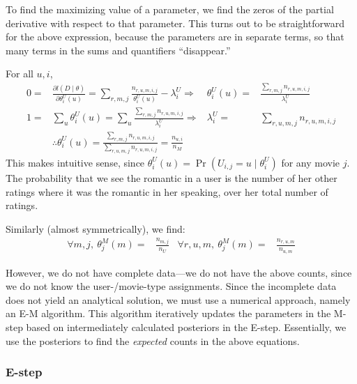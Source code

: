 \documentclass{article}
\newcommand{\LLL}  [2]{{ l \left( #1 \mid #2 \right) }}
\newcommand{\PO}   [1]{{ \Pr \left( #1 \right) }}
\newcommand{\PP}   [2]{{ \PO{ #1 \mid #2 } }}
\begin{document}
To find the maximizing value of a parameter, we find the zeros of the
partial derivative with respect to that parameter. This turns out to
be straightforward for the above expression, because the parameters
are in separate terms, so that many terms in the sums and quantifiers
``disappear.''

For all $u,i$,
\begin{align}
  0 =& \frac{ \partial \LLL{D}{\theta} }{ \partial \theta^U_i(u) }
  = \sum_{r,m,j} \frac{ n_{r,u,m,i,j} }{ \theta^U_i(u) } - \lambda^U_i
  \Rightarrow &
  \theta^U_i(u) =& \frac{ \sum_{r,m,j} n_{r,u,m,i,j} }{ \lambda^U_i } \\
  1 =& \sum_u \theta^U_i(u) 
  = \sum_u \frac{ \sum_{r,m,j} n_{r,u,m,i,j} }{ \lambda^U_i }
  \Rightarrow &
  \lambda^U_i =& \sum_{r,u,m,j} n_{r,u,m,i,j} \\
  & \therefore \theta^U_i(u)
  = \frac{ \sum_{r,m,j} n_{r,u,m,i,j} }{ \sum_{r,u,m,j} n_{r,u,m,i,j} }
  = \frac{ n_{u,i} }{ n_M }
\end{align}
This makes intuitive sense, since $\theta^U_i(u) = \PP{U_{i,j} =
u}{\theta^U_i}$ for any movie $j$. The probability that we see the
romantic in a user is the number of her other ratings where it was the
romantic in her speaking, over her total number of ratings.

Similarly (almost symmetrically), we find:
\begin{align}
\forall m,j,\ \theta^M_j(m) =& \frac{ n_{m,j} }{ n_U } &
\forall r,u,m,\ \theta^M_j(m) =& \frac{ n_{r,u,m} }{ n_{u,m} }
\end{align}

However, we do not have complete data---we do not have the above
counts, since we do not know the user-/movie-type assignments. Since
the incomplete data does not yield an analytical solution, we must use
a numerical approach, namely an E-M algorithm. This algorithm
iteratively updates the parameters in the M-step based on
intermediately calculated posteriors in the E-step. Essentially, we
use the posteriors to find the {\em expected} counts in the above
equations.

\subsubsection{E-step}
\end{document}
